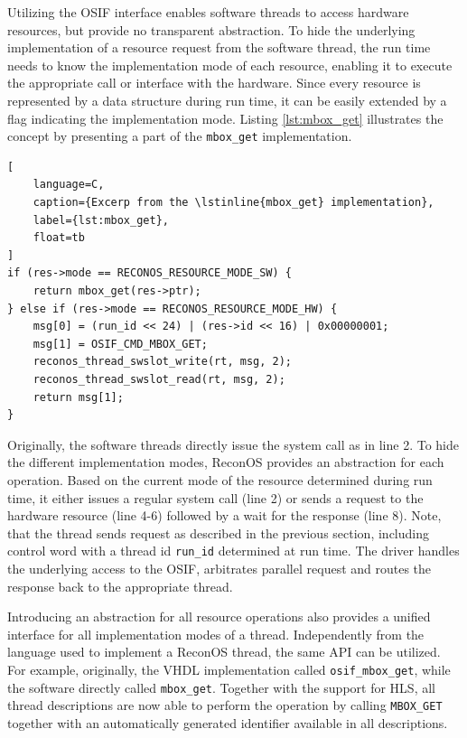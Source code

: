 Utilizing the \ac{OSIF} interface enables software threads to access hardware
resources, but provide no transparent abstraction. To hide the underlying
implementation of a resource request from the software thread, the run time
needs to know the implementation mode of each resource, enabling it to execute
the appropriate call or interface with the hardware. Since every resource is
represented by a data structure during run time, it can be easily extended by a
flag indicating the implementation mode. Listing \ref{lst:mbox_get}
illustrates the concept by presenting a part of the \lstinline{mbox_get}
implementation.
\begin{lstlisting}[
	language=C,
	caption={Excerp from the \lstinline{mbox_get} implementation},
	label={lst:mbox_get},
	float=tb
]
if (res->mode == RECONOS_RESOURCE_MODE_SW) {
	return mbox_get(res->ptr);
} else if (res->mode == RECONOS_RESOURCE_MODE_HW) {
	msg[0] = (run_id << 24) | (res->id << 16) | 0x00000001;
	msg[1] = OSIF_CMD_MBOX_GET;
	reconos_thread_swslot_write(rt, msg, 2);
	reconos_thread_swslot_read(rt, msg, 2);
	return msg[1];
}
\end{lstlisting}
Originally, the software threads directly issue the system call as in line 2.
To hide the different implementation modes, ReconOS provides an abstraction
for each operation. Based on the current mode of the resource determined
during run time, it either issues a regular system call (line 2) or sends a
request to the hardware resource (line 4-6) followed by a wait for the
response (line 8). Note, that the thread sends request as described in the
previous section, including control word with a thread id \lstinline{run_id}
determined at run time. The driver handles the underlying access to the
\ac{OSIF}, arbitrates parallel request and routes the response back to the
appropriate thread.

Introducing an abstraction for all resource operations also provides a unified
interface for all implementation modes of a thread. Independently from the
language used to implement a ReconOS thread, the same \ac{API} can be
utilized. For example, originally, the \ac{VHDL} implementation called
\lstinline{osif_mbox_get}, while the software directly called
\lstinline{mbox_get}. Together with the support for \ac{HLS}, all thread
descriptions are now able to perform the operation by calling
\lstinline{MBOX_GET} together with an automatically generated identifier
available in all descriptions.

